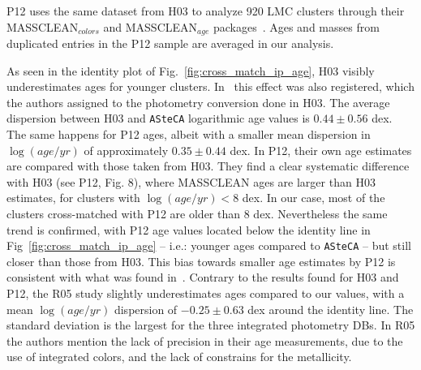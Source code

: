 \documentclass{aa}
\begin{document}
P12 uses the same dataset from H03 to analyze 920 LMC clusters through their
MASSCLEAN$_{colors}$ and MASSCLEAN$_{age}$
packages~\citep{Popescu_2010a,Popescu_2010b}. Ages and masses from duplicated
entries in the P12 sample are averaged in our analysis.


As seen in the identity plot of Fig.~\ref{fig:cross_match_ip_age}, H03
visibly underestimates ages for younger clusters.
In~\citet[][see Fig. 1]{de_Grijs_2006} this effect was also registered, which
the authors assigned to the photometry conversion done in H03. The average
dispersion between H03 and \texttt{ASteCA} logarithmic age values is
$0.44{\pm}0.56$ dex.
%
The same happens for P12 ages, albeit with a smaller mean dispersion in
$\log(age/yr)$ of approximately $0.35{\pm}0.44$ dex.
In P12, their own age estimates are compared with those taken from H03.
They find a clear systematic difference with H03 (see P12, Fig. 8),
where MASSCLEAN ages are larger than H03 estimates, for clusters with
$\log(age/yr){<}8$ dex. In our case, most of the clusters cross-matched with P12 are
older than 8 dex. Nevertheless the same trend is confirmed, with P12 age values
located below the identity line in Fig~\ref{fig:cross_match_ip_age} -- i.e.:
younger ages compared to \texttt{ASteCA} -- but still closer than those from
H03. This bias towards smaller age estimates by P12 is consistent with what was
found in~\cite{Choudhury_2015}.
%
Contrary to the results found for H03 and P12, the R05 study slightly
underestimates ages compared to our values, with a mean $\log(age/yr)$
dispersion of $-0.25{\pm}0.63$ dex around the identity line. The standard
deviation is the largest for the three integrated photometry DBs. In R05 the
authors mention the lack of precision in their age measurements, due to the use
of integrated colors, and the lack of constrains for the metallicity.
\end{document}
